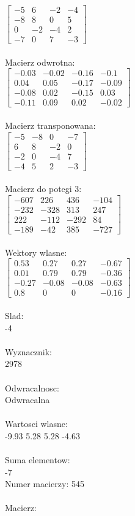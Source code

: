 \documentclass[a4paper,12pt]{article}
\begin{document}
$\begin{bmatrix} -5&6&-2&-4\\-8&8&0&5\\0&-2&-4&2\\-7&0&7&-3 \end{bmatrix}$
\\
\\
Macierz odwrotna:\\

$\begin{bmatrix} -0.03&-0.02&-0.16&-0.1\\0.04&0.05&-0.17&-0.09\\-0.08&0.02&-0.15&0.03\\-0.11&0.09&0.02&-0.02 \end{bmatrix}$
\\
\\
Macierz transponowana:\\

$\begin{bmatrix} -5&-8&0&-7\\6&8&-2&0\\-2&0&-4&7\\-4&5&2&-3 \end{bmatrix}$
\\
\\
Macierz do potegi 3:\\

$\begin{bmatrix} -607&226&436&-104\\-232&-328&313&247\\222&-112&-292&84\\-189&-42&385&-727 \end{bmatrix}$
\\
\\
Wektory wlasne:\\

$\begin{bmatrix} 0.53&0.27&0.27&-0.67\\0.01&0.79&0.79&-0.36\\-0.27&-0.08&-0.08&-0.63\\0.8&0&0&-0.16 \end{bmatrix}$
\\
\\
Slad:\\
-4
\\
\\
Wyznacznik:\\
2978
\\
\\
Odwracalnosc:\\
Odwracalna
\\
\\
Wartosci wlasne:\\
-9.93 5.28 5.28 -4.63
\\
\\
Suma elementow:\\
-7
\\
\newpage
Numer macierzy:
545
\\
\\
Macierz:\\
\end{document}
